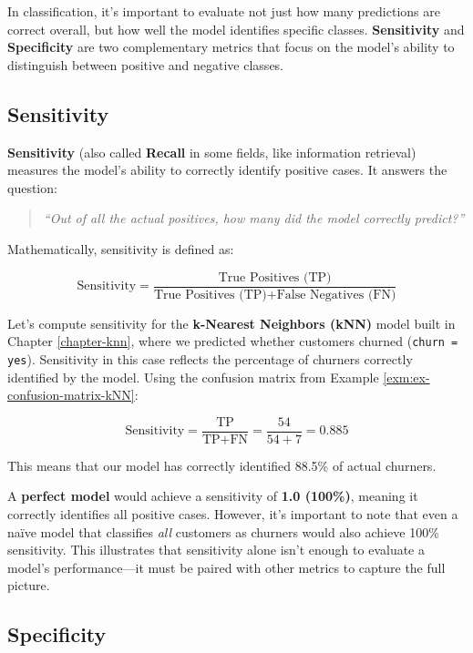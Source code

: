 \documentclass[
]{book}
\newcommand{\passthrough}[1]{#1}
\theoremstyle{definition}
\theoremstyle{definition}
\theoremstyle{definition}
\theoremstyle{definition}
\theoremstyle{remark}
\begin{document}
In classification, it's important to evaluate not just how many predictions are correct overall, but how well the model identifies specific classes. \textbf{Sensitivity} and \textbf{Specificity} are two complementary metrics that focus on the model's ability to distinguish between positive and negative classes.

\subsection*{Sensitivity}\label{sensitivity}

\textbf{Sensitivity} (also called \textbf{Recall} in some fields, like information retrieval) measures the model's ability to correctly identify positive cases. It answers the question:

\begin{quote}
\emph{``Out of all the actual positives, how many did the model correctly predict?''}
\end{quote}

Mathematically, sensitivity is defined as:

\[
\text{Sensitivity} = \frac{\text{True Positives (TP)}}{\text{True Positives (TP)} + \text{False Negatives (FN)}}
\]

Let's compute sensitivity for the \textbf{k-Nearest Neighbors (kNN)} model built in Chapter \ref{chapter-knn}, where we predicted whether customers churned (\passthrough{\lstinline!churn = yes!}). Sensitivity in this case reflects the percentage of churners correctly identified by the model. Using the confusion matrix from Example \ref{exm:ex-confusion-matrix-kNN}:

\[
\text{Sensitivity} = \frac{\text{TP}}{\text{TP} + \text{FN}} = \frac{54}{54 + 7} = 0.885
\]

This means that our model has correctly identified 88.5\% of actual churners.

A \textbf{perfect model} would achieve a sensitivity of \textbf{1.0 (100\%)}, meaning it correctly identifies all positive cases. However, it's important to note that even a naïve model that classifies \emph{all} customers as churners would also achieve 100\% sensitivity. This illustrates that sensitivity alone isn't enough to evaluate a model's performance---it must be paired with other metrics to capture the full picture.

\subsection*{Specificity}\label{specificity}
\end{document}
